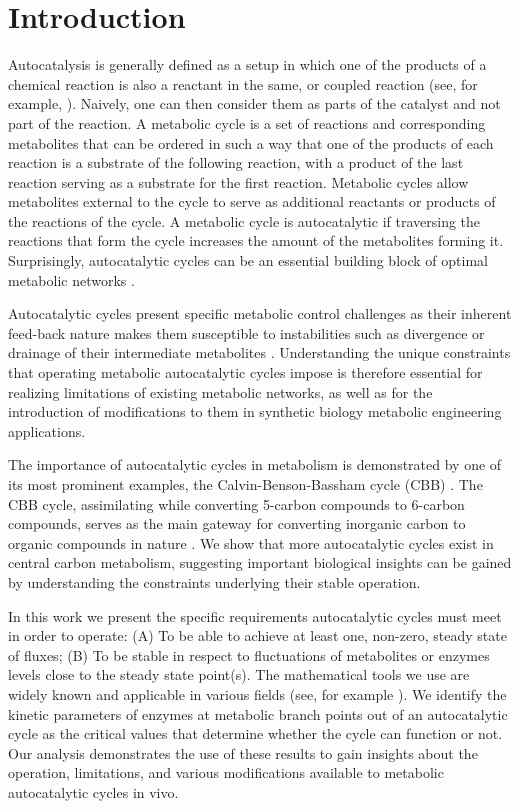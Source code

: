 \section{Introduction}
    Autocatalysis is generally defined as a setup in which one of the products of a chemical reaction is also a reactant in the same, or coupled reaction (see, for example, \cite{Steinfeld1999-iw}).
    Naively, one can then consider them as parts of the catalyst and not part of the reaction.
    A metabolic cycle is a set of reactions and corresponding metabolites that can be ordered in such a way that one of the products of each reaction is a substrate of the following reaction, with a product of the last reaction serving as a substrate for the first reaction.
    Metabolic cycles allow metabolites external to the cycle to serve as additional reactants or products of the reactions of the cycle.
    A metabolic cycle is autocatalytic if traversing the reactions that form the cycle increases the amount of the metabolites forming it.
    Surprisingly, autocatalytic cycles can be an essential building block of optimal metabolic networks \cite{Riehl2010-yh}.

    Autocatalytic cycles present specific metabolic control challenges as their inherent feed-back nature makes them susceptible to instabilities such as divergence or drainage of their intermediate metabolites \cite{Fell1999,Reznik2010-te}.
    Understanding the unique constraints that operating metabolic autocatalytic cycles impose is therefore essential for realizing limitations of existing metabolic networks, as well as for the introduction of modifications to them in synthetic biology metabolic engineering applications.

    The importance of autocatalytic cycles in metabolism is demonstrated by one of its most prominent examples, the Calvin-Benson-Bassham cycle (CBB) \cite{Benson1950-cl}.
    The CBB cycle, assimilating  while converting 5-carbon compounds to 6-carbon compounds, serves as the main gateway for converting inorganic carbon to organic compounds in nature \cite{Raven2012-le}.
    We show that more autocatalytic cycles exist in central carbon metabolism, suggesting important biological insights can be gained by understanding the constraints underlying their stable operation.

    In this work we present the specific requirements autocatalytic cycles must meet in order to operate: (A) To be able to achieve at least one, non-zero, steady state of fluxes; 
    (B) To be stable in respect to fluctuations of metabolites or enzymes levels close to the steady state point(s).
    The mathematical tools we use are widely known and applicable in various fields (see, for example \cite{Strogatz2014-hp}).
    We identify the kinetic parameters of enzymes at metabolic branch points out of an autocatalytic cycle as the critical values that determine whether the cycle can function or not.
    Our analysis demonstrates the use of these results to gain insights about the operation, limitations, and various modifications available to metabolic autocatalytic cycles in vivo.

